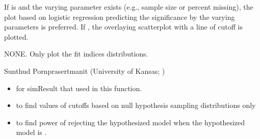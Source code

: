 \documentclass[a4paper]{book}
\begin{document}
\begin{Arguments}
\begin{ldescription}
\item[\code{logistic}] 
If  is  and the varying parameter exists (e.g., sample size or percent missing), the plot based on logistic regression predicting the significance by the varying parameters is preferred. If , the overlaying scatterplot with a line of cutoff is plotted.

\end{ldescription}
\end{Arguments}
%
\begin{Value}
NONE. Only plot the fit indices distributions.
\end{Value}
%
\begin{Author}\relax
Sunthud Pornprasertmanit (University of Kansas; )
\end{Author}
%
\begin{SeeAlso}\relax
\begin{itemize}

\item {} for simResult that used in this function.
\item {} to find values of cutoffs based on null hypothesis sampling distributions only
\item {} to find power of rejecting the hypothesized model when the hypothesized model is .

\end{itemize}

\end{SeeAlso}
%
\end{document}
